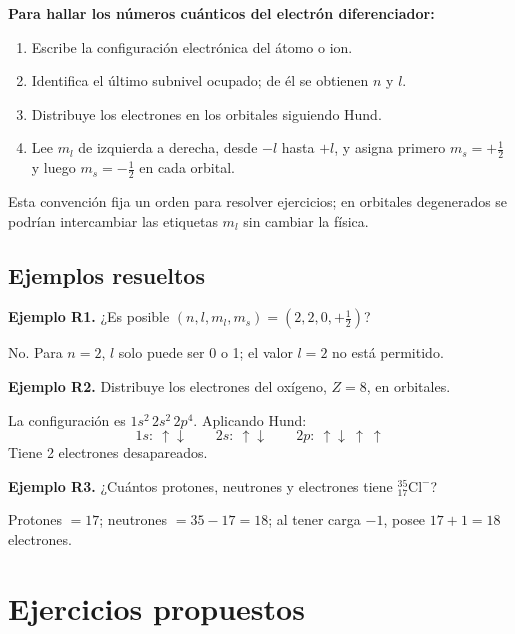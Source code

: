 \documentclass[12pt, letterpaper]{article}
\begin{document}
\begin{cuadropasos}
  \textbf{Para hallar los números cuánticos del electrón diferenciador:}
  \begin{enumerate}[leftmargin=*]
    \item Escribe la configuración electrónica del átomo o ion.
    \item Identifica el último subnivel ocupado; de él se obtienen $n$ y $l$.
    \item Distribuye los electrones en los orbitales siguiendo Hund.
    \item Lee $m_l$ de izquierda a derecha, desde $-l$ hasta $+l$, y asigna primero $m_s=+\tfrac12$ y luego $m_s=-\tfrac12$ en cada orbital.
  \end{enumerate}
  Esta convención fija un orden para resolver ejercicios; en orbitales degenerados se podrían intercambiar las etiquetas $m_l$ sin cambiar la física.
\end{cuadropasos}

\subsection{Ejemplos resueltos}
\textbf{Ejemplo R1.} ¿Es posible $(n,l,m_l,m_s)=(2,2,0,+\tfrac12)$?
\begin{cuadrosolucion}
  No. Para $n=2$, $l$ solo puede ser 0 o 1; el valor $l=2$ no está permitido.
\end{cuadrosolucion}

\textbf{Ejemplo R2.} Distribuye los electrones del oxígeno, $Z=8$, en orbitales.
\begin{cuadrosolucion}
  La configuración es $1s^2\,2s^2\,2p^4$. Aplicando Hund:
  \[
    1s:\ \boxed{\uparrow\downarrow}\qquad
    2s:\ \boxed{\uparrow\downarrow}\qquad
    2p:\ \boxed{\uparrow\downarrow}\ \boxed{\uparrow}\ \boxed{\uparrow}
  \]
  Tiene 2 electrones desapareados.
\end{cuadrosolucion}

\textbf{Ejemplo R3.} ¿Cuántos protones, neutrones y electrones tiene $^{35}_{17}\mathrm{Cl}^{-}$?
\begin{cuadrosolucion}
  Protones $=17$; neutrones $=35-17=18$; al tener carga $-1$, posee $17+1=18$ electrones.
\end{cuadrosolucion}

\newpage
\section{Ejercicios propuestos}
\end{document}
